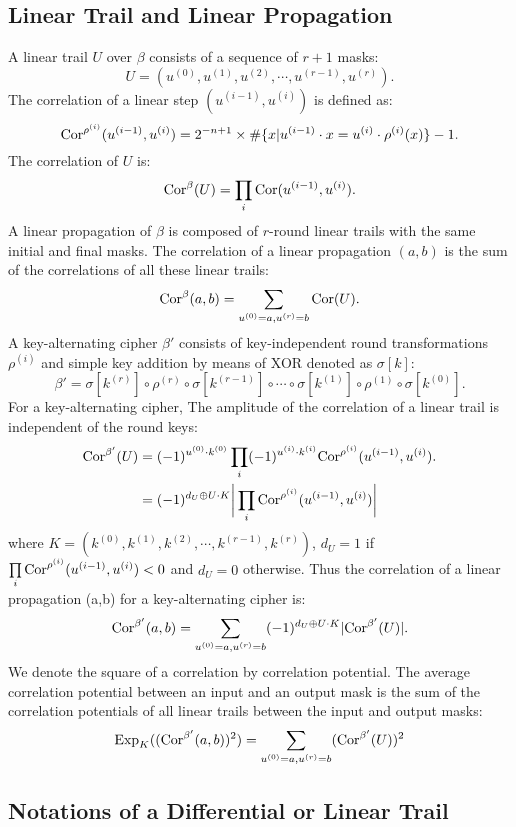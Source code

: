 \subsection{Linear Trail and Linear Propagation}

A linear trail $U$ over $\beta$ consists of a sequence of $r+1$ masks:
\[
    U=(u^{(0)},u^{(1)},u^{(2)},\cdots,u^{(r-1)},u^{(r)}).
\]
The correlation of a linear step $(u^{(i-1)},u^{(i)})$ is defined as:
\[
    \text{Cor}^{\rho^{(i)}}(u^{(i-1)},u^{(i)})=2^{-n+1}\times\#\{x|u^{(i-1)}\cdot x=u^{(i)}\cdot \rho^{(i)}(x)\}-1.
\]
The correlation of $U$ is:
\[
    \text{Cor}^{\beta}(U)=\prod\limits_i\text{Cor}(u^{(i-1)},u^{(i)}).
\]
A linear propagation of $\beta$ is composed of $r$-round linear trails with the same initial and final masks. The correlation of a linear propagation $(a,b)$ is the sum of the correlations of all these linear trails:
\[
    \text{Cor}^{\beta}(a,b)=\sum\limits_{u^{(0)}=a,u^{(r)}=b}\text{Cor}(U).
\]
A key-alternating cipher $\beta'$ consists of key-independent round transformations $\rho^{(i)}$ and simple key addition by means of XOR denoted as $\sigma[k]$:
\[
    \beta'=\sigma[k^{(r)}]\circ\rho^{(r)}\circ\sigma[k^{(r-1)}]\circ\cdots\circ\sigma[k^{(1)}]\circ\rho^{(1)}\circ\sigma[k^{(0)}].
\]
For a key-alternating cipher, The amplitude of the correlation of a linear trail is independent of the round keys:
\begin{align*}
    \text{Cor}^{\beta'}(U)&=(-1)^{u^{(0)}\cdot k^{(0)}}\prod\limits_i(-1)^{u^{(i)}\cdot k^{(i)}}\text{Cor}^{\rho^{(i)}}(u^{(i-1)},u^{(i)}).\\
    &=(-1)^{d_U\oplus U\cdot K}\bigg\lvert\prod\limits_i\text{Cor}^{\rho^{(i)}}(u^{(i-1)},u^{(i)})\bigg\rvert
\end{align*}
where $K=(k^{(0)},k^{(1)},k^{(2)},\cdots,k^{(r-1)},k^{(r)})$, $d_U=1$ if $\prod\limits_i\text{Cor}^{\rho^{(i)}}(u^{(i-1)},u^{(i)})<0$ and $d_U=0$ otherwise. Thus the correlation of a linear propagation (a,b) for a key-alternating cipher is:
\[
    \text{Cor}^{\beta'}(a,b)=\sum\limits_{u^{(0)}=a,u^{(r)}=b}(-1)^{d_U\oplus U\cdot K}\lvert\text{Cor}^{\beta'}(U)\rvert.
\]
We denote the square of a correlation by correlation potential. The average correlation potential between an input and an output mask is the sum of the correlation potentials of all linear trails between the input and output masks:
\[
    \text{Exp}_{K}((\text{Cor}^{\beta'}(a,b))^2)=\sum\limits_{u^{(0)}=a,u^{(r)}=b}(\text{Cor}^{\beta'}(U))^2
\]


\subsection{Notations of a Differential or Linear Trail \cite{DR01}}

